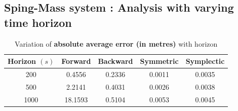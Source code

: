 \documentclass[11pt]{article}
\begin{document}
\subsection*{Sping-Mass system : Analysis with varying time horizon}
\begin{table}[H]
    \begin{center}
        \caption*{Variation of \textbf{absolute average error (in metres)} with horizon}
        \vspace{2mm}
        \begin{tabular}{|c|c|c|c|c|}
            \hline
             Horizon $(s)$ &  Forward & Backward & Symmetric & Symplectic \\
            \hline
            200  &  0.4556 & 0.2336   &  0.0011 & 0.0035\\
            \hline
            500   &  2.2141 & 0.4031   &  0.0026 & 0.0038\\
            \hline   
            1000   &  18.1593 & 0.5104   &  0.0053 & 0.0045\\
            \hline     		
        \end{tabular}
    \end{center}
 \end{table}
\end{document}
